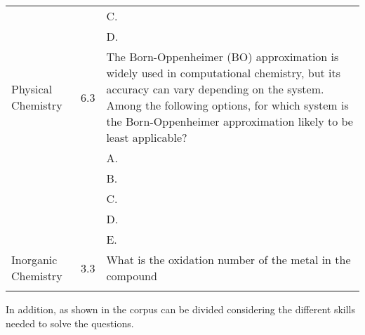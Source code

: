 \begin{xltabular}{\textwidth}{p{2.7cm}p{4em}X}
        & & C.  \\
        & & D.  \\
        \midrule
        Physical Chemistry & 6.3 & The Born-Oppenheimer (BO) approximation is widely used in computational chemistry, but its accuracy can vary depending on the system. Among the following options, for which system is the Born-Oppenheimer approximation likely to be least applicable? \\
        & & A.  \\
        & & B.  \\
        & & C.  \\
        & & D.  \\
        & & E.  \\
        \midrule
        Inorganic Chemistry & 3.3 & What is the oxidation number of the metal in the compound \\
        \bottomrule
    \label{tab:chembench_corpus_topic}
\end{xltabular}

\normalsize

In addition, as shown in  the \chembench corpus can be divided considering the different skills needed to solve the questions.

